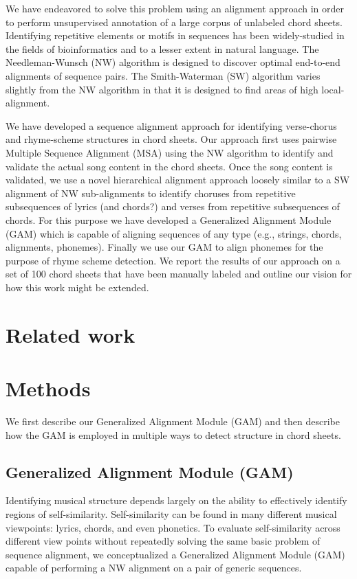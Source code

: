 \documentclass[12pt]{article}
\begin{document}
We have endeavored to solve this problem using an alignment approach in order to perform unsupervised annotation of a large corpus of unlabeled chord sheets. Identifying repetitive elements or motifs in sequences has been widely-studied in the fields of bioinformatics and to a lesser extent in natural language. The Needleman-Wunsch (NW) algorithm is designed to discover optimal end-to-end alignments of sequence pairs. The Smith-Waterman (SW) algorithm varies slightly from the NW algorithm in that it is designed to find areas of high local-alignment.

We have developed a sequence alignment approach for identifying verse-chorus and rhyme-scheme structures in chord sheets. Our approach first uses pairwise Multiple Sequence Alignment (MSA) using the NW algorithm to identify and validate the actual song content in the chord sheets. Once the song content is validated, we use a novel hierarchical alignment approach loosely similar to a SW alignment of NW sub-alignments to identify choruses from repetitive subsequences of lyrics (and chords?) and verses from repetitive subsequences of chords. For this purpose we have developed a Generalized Alignment Module (GAM) which is capable of aligning sequences of any type (e.g., strings, chords, alignments, phonemes). Finally we use our GAM to align phonemes for the purpose of rhyme scheme detection. We report the results of our approach on a set of 100 chord sheets that have been manually labeled and outline our vision for how this work might be extended.

\section{Related work}



\section{Methods}

We first describe our Generalized Alignment Module (GAM) and then describe how the GAM is employed in multiple ways to detect structure in chord sheets.

\subsection{Generalized Alignment Module (GAM)}

Identifying musical structure depends largely on the ability to effectively identify regions of self-similarity. Self-similarity can be found in many different musical viewpoints: lyrics, chords, and even phonetics. To evaluate self-similarity across different view points without repeatedly solving the same basic problem of sequence alignment, we conceptualized a Generalized Alignment Module (GAM) capable of performing a NW alignment on a pair of generic sequences.
\end{document}
